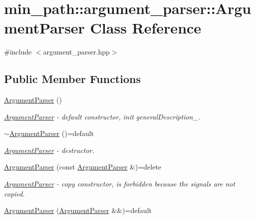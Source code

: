 \hypertarget{classmin__path_1_1argument__parser_1_1_argument_parser}{}\section{min\+\_\+path\+:\+:argument\+\_\+parser\+:\+:Argument\+Parser Class Reference}
\label{classmin__path_1_1argument__parser_1_1_argument_parser}


{\ttfamily \#include $<$argument\+\_\+parser.\+hpp$>$}

\subsection*{Public Member Functions}
\begin{DoxyCompactItemize}
\item 
\hyperlink{classmin__path_1_1argument__parser_1_1_argument_parser_afd444aa0096628fee7fa3cd54dd8c00e}{Argument\+Parser} ()
\begin{DoxyCompactList}\small\item\em \hyperlink{classmin__path_1_1argument__parser_1_1_argument_parser}{Argument\+Parser} -\/ default constructor, init general\+Description\+\_\+. \end{DoxyCompactList}\item 
\hyperlink{classmin__path_1_1argument__parser_1_1_argument_parser_a299b7d944021ccd4bb8d3f1f6edd0718}{$\sim$\+Argument\+Parser} ()=default
\begin{DoxyCompactList}\small\item\em \hyperlink{classmin__path_1_1argument__parser_1_1_argument_parser}{Argument\+Parser} -\/ destructor. \end{DoxyCompactList}\item 
\hyperlink{classmin__path_1_1argument__parser_1_1_argument_parser_a90ccb3b7ce3f2c34a0b78533a0f6c128}{Argument\+Parser} (const \hyperlink{classmin__path_1_1argument__parser_1_1_argument_parser}{Argument\+Parser} \&)=delete
\begin{DoxyCompactList}\small\item\em \hyperlink{classmin__path_1_1argument__parser_1_1_argument_parser}{Argument\+Parser} -\/ copy constructor, is forbidden because the signals are not copied. \end{DoxyCompactList}\item 
\hyperlink{classmin__path_1_1argument__parser_1_1_argument_parser_a84ce25cfd160d268d2c318a3c52c08fa}{Argument\+Parser} (\hyperlink{classmin__path_1_1argument__parser_1_1_argument_parser}{Argument\+Parser} \&\&)=default

\end{DoxyCompactItemize}
